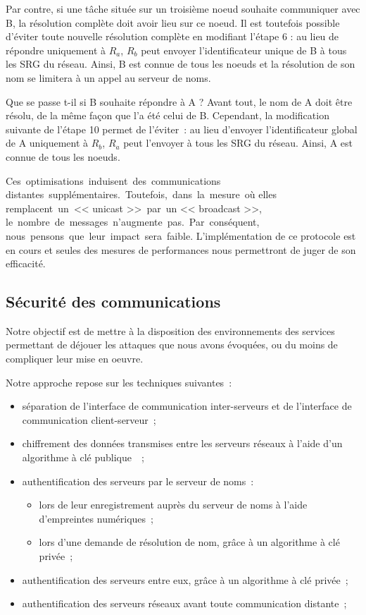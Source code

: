 Par contre, si une t\^ache situ\'ee sur un troisi\`eme noeud souhaite communiquer avec B, la r\'esolution compl\`ete doit avoir lieu sur ce noeud.
Il est toutefois possible d'\'eviter toute nouvelle r\'esolution compl\`ete en modifiant l'\'etape 6 : au lieu de r\'epondre uniquement \`a \(R_{a}\), \(R_{b}\) peut envoyer l'identificateur unique de B \`a tous les SRG du r\'eseau. Ainsi, B est connue de tous les noeuds et la r\'esolution de son nom se limitera \`a un appel au serveur de noms.

Que se passe t-il si B souhaite r\'epondre \`a A ? Avant tout, le nom de A doit \^etre r\'esolu, de la m\^eme fa\c{c}on que l'a \'et\'e celui de B. Cependant, la modification suivante de l'\'etape 10 permet de l'\'eviter~: au lieu d'envoyer l'identificateur global de A uniquement \`a \(R_{b}\), \(R_{a}\) peut l'envoyer \`a tous les SRG du r\'eseau. Ainsi, A est connue de tous les noeuds. 

Ces~optimisations~induisent~des~communications distantes~suppl\'ementaires.~Toutefois,~dans~la~mesure~o\`u elles remplacent~un~<< unicast >>~par~un << broadcast >>, le~nombre~de~messages~n'augmente~pas.~Par~cons\'equent, nous~pensons~que~leur~impact~sera~faible. L'impl\'e\-mentation de ce protocole est en cours et seules des mesures 
de performances nous permettront de juger de son efficacit\'e.

\subsection{S\'ecurit\'e des communications}

Notre objectif est de mettre \`a la disposition des environnements des services permettant de d\'ejouer les attaques que nous avons \'evoqu\'ees, ou du moins de compliquer leur mise en oeuvre.

Notre approche repose sur les techniques suivantes~:
\begin{itemize}
\item s\'eparation de l'interface de communication inter-serveurs et de l'interface de communication client-serveur~;
\item chiffrement des donn\'ees transmises entre les serveurs r\'eseaux \`a l'aide d'un algorithme \`a cl\'e publique~\cite{Diffie76}~;
\item authentification des serveurs par le serveur de noms~:
	\begin{itemize}
	\item lors de leur enregistrement aupr\`es du serveur de noms \`a l'aide d'empreintes num\'eriques~;
	\item lors d'une demande de r\'esolution de nom, gr\^ace \`a un algorithme \`a cl\'e priv\'ee~;
	\end{itemize}
\item authentification des serveurs entre eux, gr\^ace \`a un algorithme \`a cl\'e priv\'ee~; 
\item authentification des serveurs r\'eseaux avant toute communication distante~;
\end{itemize}

